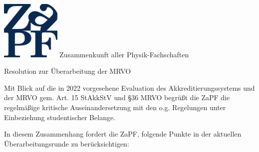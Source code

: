 \documentclass[DIV=calc]{scrartcl}
\newcommand{\zapf}{ZaPF\xspace}
\begin{document}
\hspace{0.87\textwidth}
\begin{minipage}{120pt}
	\vspace{-1.8cm}
	\includegraphics[width=80pt]{../logo.pdf}
	\centering
	\small Zusammenkunft aller Physik-Fachschaften
\end{minipage}

\begin{center}
  \huge{Resolution zur Überarbeitung der MRVO}\vspace{.25\baselineskip}\\
  \normalsize
\end{center}
\vspace{1cm}





Mit Blick auf die in 2022 vorgesehene Evaluation des Akkreditierungssystems und der MRVO gem. Art. 15 StAkkStV und §36 MRVO begrüßt die \zapf die regelmäßige kritische Auseinandersetzung mit den o.g. Regelungen unter Einbeziehung studentischer Belange.

In diesem Zusammenhang fordert die \zapf, folgende Punkte in der aktuellen Überarbeitungsrunde zu berücksichtigen:
\end{document}
